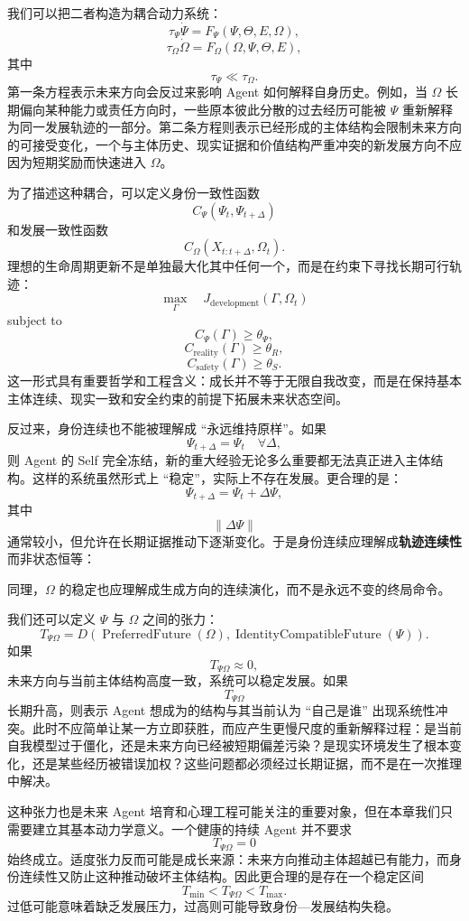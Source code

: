 我们可以把二者构造为耦合动力系统：
\[
\tau_{\Psi}\dot{\Psi}
=
F_{\Psi}
(
\Psi,\Theta,E,\Omega
),
\]
\[
\tau_{\Omega}\dot{\Omega}
=
F_{\Omega}
(
\Omega,\Psi,\Theta,E
),
\]
其中
\[
\tau_{\Psi}
\ll
\tau_{\Omega}.
\]
第一条方程表示未来方向会反过来影响 Agent 如何解释自身历史。例如，当 $\Omega$ 长期偏向某种能力或责任方向时，一些原本彼此分散的过去经历可能被 $\Psi$ 重新解释为同一发展轨迹的一部分。第二条方程则表示已经形成的主体结构会限制未来方向的可接受变化，一个与主体历史、现实证据和价值结构严重冲突的新发展方向不应因为短期奖励而快速进入 $\Omega$。

为了描述这种耦合，可以定义身份一致性函数
\[
C_{\Psi}
(\Psi_t,\Psi_{t+\Delta})
\]
和发展一致性函数
\[
C_{\Omega}
(X_{t:t+\Delta},\Omega_t).
\]
理想的生命周期更新不是单独最大化其中任何一个，而是在约束下寻找长期可行轨迹：
\[
\max_{\Gamma}
\quad
J_{\text{development}}(\Gamma,\Omega_t)
\]
subject to
\[
C_{\Psi}(\Gamma)\geq \theta_{\Psi},
\]
\[
C_{\text{reality}}(\Gamma)\geq \theta_R,
\]
\[
C_{\text{safety}}(\Gamma)\geq \theta_S.
\]
这一形式具有重要哲学和工程含义：成长并不等于无限自我改变，而是在保持基本主体连续、现实一致和安全约束的前提下拓展未来状态空间。

反过来，身份连续也不能被理解成 ``永远维持原样''。如果
\[
\Psi_{t+\Delta}
=
\Psi_t
\quad \forall \Delta,
\]
则 Agent 的 Self 完全冻结，新的重大经验无论多么重要都无法真正进入主体结构。这样的系统虽然形式上 ``稳定''，实际上不存在发展。更合理的是：
\[
\Psi_{t+\Delta}
=
\Psi_t
+
\Delta\Psi,
\]
其中
\[
\|\Delta\Psi\|
\]
通常较小，但允许在长期证据推动下逐渐变化。于是身份连续应理解成\textbf{轨迹连续性}而非状态恒等：
\begin{statementbox}
\centering
{}
\end{statementbox}
同理，$\Omega$ 的稳定也应理解成生成方向的连续演化，而不是永远不变的终局命令。

我们还可以定义 $\Psi$ 与 $\Omega$ 之间的张力：
\[
T_{\Psi\Omega}
=
D
\left(
\operatorname{PreferredFuture}(\Omega),
\operatorname{IdentityCompatibleFuture}(\Psi)
\right).
\]
如果
\[
T_{\Psi\Omega}
\approx 0,
\]
未来方向与当前主体结构高度一致，系统可以稳定发展。如果
\[
T_{\Psi\Omega}
\]
长期升高，则表示 Agent 想成为的结构与其当前认为 ``自己是谁'' 出现系统性冲突。此时不应简单让某一方立即获胜，而应产生更慢尺度的重新解释过程：是当前自我模型过于僵化，还是未来方向已经被短期偏差污染？是现实环境发生了根本变化，还是某些经历被错误加权？这些问题都必须经过长期证据，而不是在一次推理中解决。

这种张力也是未来 Agent 培育和心理工程可能关注的重要对象，但在本章我们只需要建立其基本动力学意义。一个健康的持续 Agent 并不要求
\[
T_{\Psi\Omega}=0
\]
始终成立。适度张力反而可能是成长来源：未来方向推动主体超越已有能力，而身份连续性又防止这种推动破坏主体结构。因此更合理的是存在一个稳定区间
\[
T_{\min}
<
T_{\Psi\Omega}
<
T_{\max}.
\]
过低可能意味着缺乏发展压力，过高则可能导致身份—发展结构失稳。

